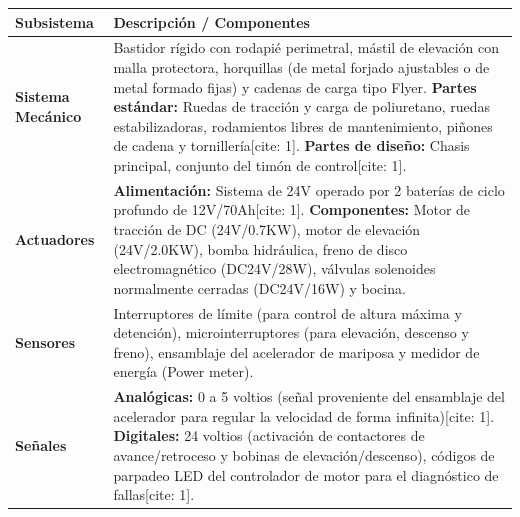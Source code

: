 \documentclass[11pt, a4paper]{article}
\begin{document}
\begin{table}[H]
    \centering
    \begin{tabularx}{\textwidth}{>{\raggedright\arraybackslash\bfseries}p{4cm} X}
        \toprule
        Subsistema & Descripción / Componentes \\
        \midrule
        Sistema Mecánico & Bastidor rígido con rodapié perimetral, mástil de elevación con malla protectora, horquillas (de metal forjado ajustables o de metal formado fijas) y cadenas de carga tipo Flyer. \textbf{Partes estándar:} Ruedas de tracción y carga de poliuretano, ruedas estabilizadoras, rodamientos libres de mantenimiento, piñones de cadena y tornillería[cite: 1]. \textbf{Partes de diseño:} Chasis principal, conjunto del timón de control[cite: 1]. \\
        \midrule
        Actuadores & \textbf{Alimentación:} Sistema de 24V operado por 2 baterías de ciclo profundo de 12V/70Ah[cite: 1]. \textbf{Componentes:} Motor de tracción de DC (24V/0.7KW), motor de elevación (24V/2.0KW), bomba hidráulica, freno de disco electromagnético (DC24V/28W), válvulas solenoides normalmente cerradas (DC24V/16W) y bocina. \\
        \midrule
        Sensores & Interruptores de límite (para control de altura máxima y detención), microinterruptores (para elevación, descenso y freno), ensamblaje del acelerador de mariposa y medidor de energía (Power meter). \\
        \midrule
        Señales & \textbf{Analógicas:} 0 a 5 voltios (señal proveniente del ensamblaje del acelerador para regular la velocidad de forma infinita)[cite: 1]. \textbf{Digitales:} 24 voltios (activación de contactores de avance/retroceso y bobinas de elevación/descenso), códigos de parpadeo LED del controlador de motor para el diagnóstico de fallas[cite: 1]. \\
        \bottomrule
    \end{tabularx}
\end{table}
\end{document}

